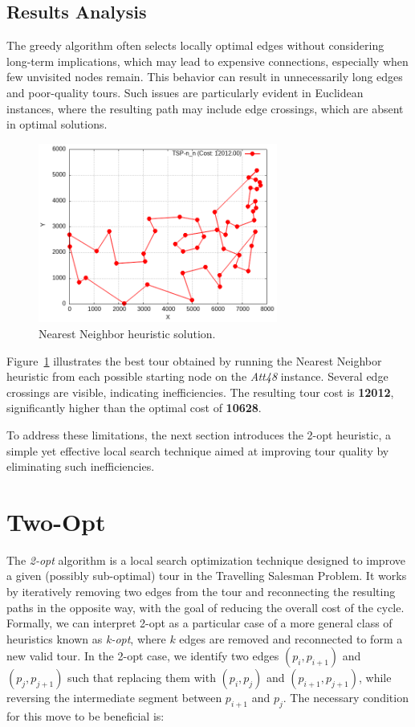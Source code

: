 \subsection{Results Analysis}
\label{sec:nn-analysis}
The greedy algorithm often selects locally optimal edges without considering long-term implications, which may lead to expensive connections, 
especially when few unvisited nodes remain. This behavior can result in unnecessarily long edges and poor-quality tours. Such issues are particularly 
evident in Euclidean instances, where the resulting path may include edge crossings, which are absent in optimal solutions.

\begin{figure}[h!]
    \centering
    \includegraphics[width=0.7\textwidth]{images/TSP_n_n.png}
    \caption{Nearest Neighbor heuristic solution.}
    \label{fig:nn-example}
\end{figure}

Figure~\ref{fig:nn-example} illustrates the best tour obtained by running the Nearest Neighbor heuristic from each possible starting node on the \textit{Att48} instance. Several edge crossings are visible, indicating inefficiencies. The resulting tour cost is \textbf{12012}, significantly higher than the optimal cost of \textbf{10628}.

To address these limitations, the next section introduces the 2-opt heuristic, a simple yet effective local search technique aimed at improving tour quality by eliminating such inefficiencies.

\section{Two-Opt}
\label{sec:2opt}

The \textit{2-opt} algorithm is a local search optimization technique designed to improve a given (possibly sub-optimal) tour 
in the Travelling Salesman Problem. It works by iteratively removing two edges from the tour and reconnecting the resulting paths 
in the opposite way, with the goal of reducing the overall cost of the cycle.
Formally, we can interpret 2-opt as a particular case of a more general class of heuristics known as \textit{k-opt}, 
where $k$ edges are removed and reconnected to form a new valid tour. In the 2-opt case, we identify two edges $(p_i, p_{i+1})$ 
and $(p_j, p_{j+1})$ such that replacing them with $(p_i, p_j)$ and $(p_{i+1}, p_{j+1})$, while reversing the intermediate segment between $p_{i+1}$ and $p_j$. 
The necessary condition for this move to be beneficial is:

